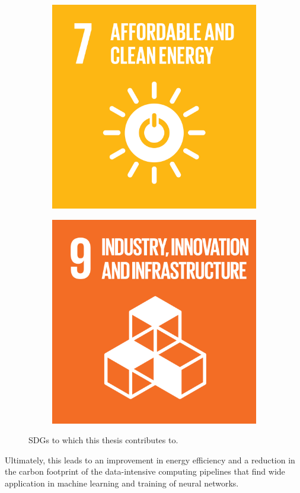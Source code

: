 \begin{figure}[b]
    \centering
    \begin{subfigure}[b]{0.5\linewidth}
        \centering
        \includegraphics[width=0.6\linewidth]{figures/1-introduction/E_SDG_goals_icons-07.png} 
        \label{fig:sdg07}
    \end{subfigure}\hfill
    \begin{subfigure}[b]{0.5\linewidth}
        \centering
        \includegraphics[width=0.6\linewidth]{figures/1-introduction/E_SDG-goals_icons-09.png}
        \label{fig:sdg09}
	\end{subfigure}
	\caption{\glspl{SDG} to which this thesis contributes to.}
	\label{fig:sdgs}
\end{figure}


Ultimately, this leads to an improvement in energy efficiency and a reduction in the carbon footprint of the data-intensive computing pipelines that find wide application in machine learning and training of neural networks.
